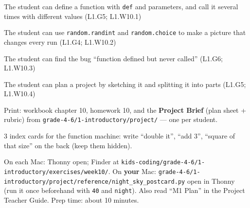 
\begin{objectives}
  \item The student can define a function with \texttt{def} and parameters, and call it several times with different values (L1.G5; L1.W10.1)
  \item The student can use \texttt{random.randint} and \texttt{random.choice} to make a picture that changes every run (L1.G4; L1.W10.2)
  \item The student can find the bug \enquote{function defined but never called} (L1.G6; L1.W10.3)
  \item The student can plan a project by sketching it and splitting it into parts (L1.G5; L1.W10.4)
\end{objectives}

\begin{materials}
  \item Print: workbook chapter 10, homework 10, and the \textbf{Project Brief} (plan sheet + rubric) from \texttt{grade-4-6/1-introductory/project/} --- one per student.
  \item 3 index cards for the function machine: write \enquote{double it}, \enquote{add 3}, \enquote{square of that size} on the back (keep them hidden).
  \item On each Mac: Thonny open; Finder at \texttt{kids-coding/grade-4-6/1-introductory/exercises/week10/}. On \textbf{your} Mac: \texttt{grade-4-6/1-introductory/project/reference/night\_sky\_postcard.py} open in Thonny (run it once beforehand with \texttt{40} and \texttt{night}). Also read \enquote{M1 Plan} in the Project Teacher Guide. Prep time: about 10 minutes.
\end{materials}


